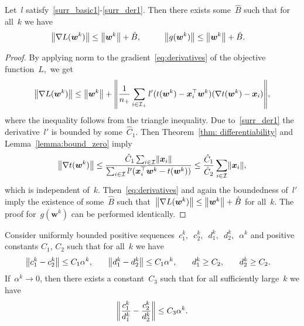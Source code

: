 \begin{lemma}\label{lemma:bound_g}
  Let~$l$ satisfy~\ref{surr_basic1}-\ref{surr_der1}. Then there exists some~$\hat{B}$ such that for all~$k$ we have
  \begin{equation*}
    \begin{aligned}
      \norm{\nabla L(\bm{w}^k)} & \leq \norm{\bm{w}^k} +  \hat{B}, \quad & \quad
      \norm{g(\bm{w}^k)} & \leq \norm{\bm{w}^k} + \hat{B}.
    \end{aligned}
  \end{equation*}
\end{lemma}
\begin{proof}
  By applying norm to the gradient~\eqref{eq:derivatives} of the objective function~$L,$ we get 
  \begin{equation*}
    \norm{\nabla L(\bm{w}^k)}
      \leq \norm{\bm{w}^k} + \norm{\frac{1}{\npos} \sum_{i \in \Ipos} l'(t(\bm{w}^k) - \bm{x}_i^{\top} \bm{w}^k)(\nabla t(\bm{w}^k) - \bm{x}_i)},
  \end{equation*}
  where the inequality follows from the triangle inequality. Due to~\ref{surr_der1} the derivative~$l'$ is bounded by some~$\hat{C}_1$. Then Theorem~\ref{thm: differentiability} and Lemma~\ref{lemma:bound_zero} imply
  \begin{equation*}
    \norm{\nabla t(\bm{w}^k)}
      \leq \frac{\hat{C}_1 \sum_{i \in \I} \norm{\bm{x}_i}}{\sum_{i \in \I} l'(\bm{x}_i^\top \bm{w}^k - t(\bm{w}^k))}
      \leq \frac{\hat{C}_1}{\hat{C}_2} \sum_{i\in \I} \norm{\bm{x}_i},
  \end{equation*}
  which is independent of~$k$. Then~\eqref{eq:derivatives} and again the boundedness of~$l'$ imply the existence of some~$\hat{B}$ such that~$\norm{\nabla L(\bm{w}^k)} \leq \norm{\bm{w}^k} + \hat{B}$ for all~$k$. The proof for~$g(\bm{w}^k)$ can be performed identically.
\end{proof}

\begin{lemma}\label{lemma:ratio}
  Consider uniformly bounded positive sequences~$c_1^k,$~$c_2^k,$~$d_1^k,$~$d_2^k,$~$\alpha^k$ and positive constants $C_1$, $C_2$ such that for all~$k$ we have
  \begin{equation*}
    \begin{aligned}
      \norm{c_1^k-c_2^k} & \leq C_1\alpha^k, \quad &
      \norm{d_1^k-d_2^k} & \leq C_1\alpha^k, \quad &
      d_1^k & \geq C_2, \quad &
      d_2^k & \geq C_2.
    \end{aligned}
  \end{equation*}
  If~$\alpha^k \to 0$, then there exists a constant~$C_3$ such that for all sufficiently large~$k$ we have
  \begin{equation*}
    \norm{\frac{c_1^k}{d_1^k} - \frac{c_2^k}{d_2^k}} \leq C_3\alpha^k.
  \end{equation*}
\end{lemma}

